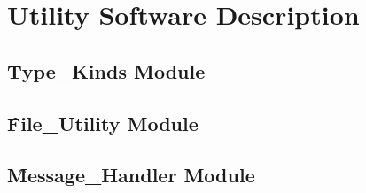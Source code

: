 \chapter{Utility Software Description}

\clearpage
\section{\f{Type\_Kinds} Module}
\label{sec:utility_type_kinds}


\clearpage
\section{\f{File\_Utility} Module}
\label{sec:utility_file_utility}


\clearpage
\section{\f{Message\_Handler} Module}
\label{sec:utility_message_handler}
